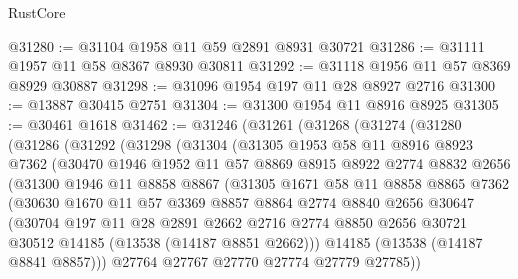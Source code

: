 \begin{lexlean}{RustCore}
\begin{coremodule}
@31280 := @31104 @1958 @11 @59 @2891 @8931 @30721
@31286 := @31111 @1957 @11 @58 @8367 @8930 @30811
@31292 := @31118 @1956 @11 @57 @8369 @8929 @30887
@31298 := @31096 @1954 @197 @11 @28 @8927 @2716
@31300 := @13887 @30415 @2751
@31304 := @31300 @1954 @11 @8916 @8925
@31305 := @30461 @1618
@31462 := @31246
    (@31261
      (@31268
        (@31274
          (@31280
            (@31286
              (@31292
                (@31298
                  (@31304
                    (@31305
                      @1953
                      @58
                      @11
                      @8916
                      @8923
                      @7362
                      (@30470
                        @1946
                        @1952
                        @11
                        @57
                        @8869
                        @8915
                        @8922
                        @2774
                        @8832
                        @2656
                        (@31300
                          @1946
                          @11
                          @8858
                          @8867
                          (@31305
                            @1671
                            @58
                            @11
                            @8858
                            @8865
                            @7362
                            (@30630
                              @1670
                              @11
                              @57
                              @3369
                              @8857
                              @8864
                              @2774
                              @8840
                              @2656
                              @30647
                              (@30704
                                @197
                                @11
                                @28
                                @2891
                                @2662
                                @2716
                                @2774
                                @8850
                                @2656
                                @30721
                                @30512
                                @14185
                                (@13538 (@14187 @8851 @2662)))
                              @14185
                              (@13538 (@14187 @8841 @8857)))
                            @27764
                            @27767
                            @27770
                            @27774
                            @27779
                            @27785))

\end{coremodule}
\end{lexlean}
